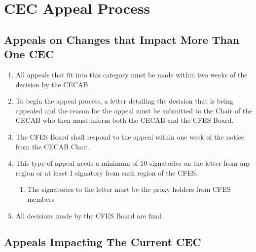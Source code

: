 \section{CEC Appeal Process}
\label{cec-appeal-process}

\subsection{Appeals on Changes that Impact More Than One CEC}
\label{appeals-on-changes-that-impact-more-than-one-cec}

\begin{enumerate}
 \item
  All appeals that fit into this category must be made within two weeks of the decision by the CECAB.
 \item
  To begin the appeal process, a letter detailing the decision that is being appealed and the reason for the appeal must be submitted to the Chair of the CECAB who then must inform both the CECAB and the CFES Board.
 \item
  The CFES Board shall respond to the appeal within one week of the notice from the CECAB Chair.
 \item
  This type of appeal needs a minimum of 10 signatories on the letter from any region or at least 1 signatory from each region of the CFES.

  \begin{enumerate}
   \item
    The signatories to the letter must be the proxy holders from CFES members
  \end{enumerate}

 \item
  All decisions made by the CFES Board are final.
\end{enumerate}

\subsection{Appeals Impacting The Current CEC}
\label{appeals-impacting-the-current-cec}

